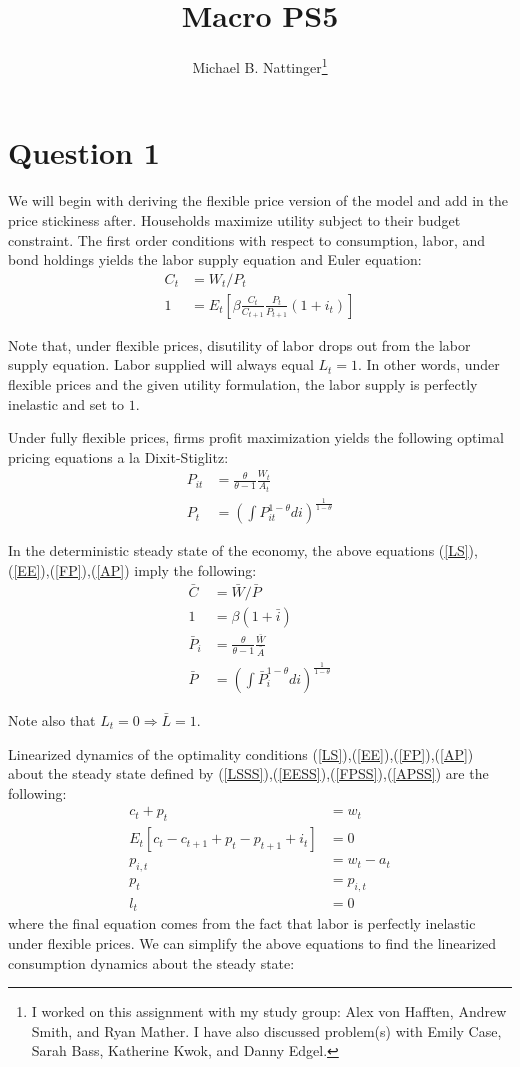 \documentclass[11pt]{article} %
\title{Macro PS5}
\author{Michael B. Nattinger\footnote{I worked on this assignment with my study group: Alex von Hafften, Andrew Smith, and Ryan Mather. I have also discussed problem(s) with Emily Case, Sarah Bass, Katherine Kwok, and Danny Edgel.}}
\begin{document}
\maketitle
\section{Question 1}
We will begin with deriving the flexible price version of the model and add in the price stickiness after. Households maximize utility subject to their budget constraint. The first order conditions with respect to consumption, labor, and bond holdings yields the labor supply equation and Euler equation:
\begin{align}
C_t &= W_t/P_t \label{LS}\\
1 &= E_t\left[ \beta \frac{C_t}{C_{t+1}} \frac{P_t}{P_{t+1}} (1+i_t) \right] \label{EE}
\end{align}

Note that, under flexible prices, disutility of labor drops out from the labor supply equation. Labor supplied will always equal $L_t = 1$. In other words, under flexible prices and the given utility formulation, the labor supply is perfectly inelastic and set to $1$.

Under fully flexible prices, firms profit maximization yields the following optimal pricing equations a la Dixit-Stiglitz:
\begin{align}
P_{it} &= \frac{\theta}{\theta - 1}\frac{W_t}{A_{t}} \label{FP}\\
P_{t} &= \left(\int P_{it}^{1-\theta } di \right)^{\frac{1}{1-\theta}} \label{AP}
\end{align}

In the deterministic steady state of the economy, the above equations (\ref{LS}),(\ref{EE}),(\ref{FP}),(\ref{AP}) imply the following:
\begin{align}
\bar{C} &= \bar{W}/\bar{P} \label{LSSS}\\
1 &= \beta(1+\bar{i}) \label{EESS}\\
\bar{P}_{i} &= \frac{\theta}{\theta - 1}\frac{\bar{W}}{\bar{A}} \label{FPSS}\\
\bar{P} &= \left(\int \bar{P}_{i}^{1-\theta } di \right)^{\frac{1}{1-\theta}} \label{APSS}
\end{align}

Note also that $L_t = 0 \Rightarrow \bar{L} = 1$.

Linearized dynamics of the optimality conditions  (\ref{LS}),(\ref{EE}),(\ref{FP}),(\ref{AP}) about the steady state defined by  (\ref{LSSS}),(\ref{EESS}),(\ref{FPSS}),(\ref{APSS}) are the following:
\begin{align*}
c_t + p_t &= w_t\\
 E_t[c_t - c_{t+1} + p_t - p_{t+1} +i_t] &= 0 \\
p_{i,t} &= w_t - a_t \\
p_t &= p_{i,t} \\
l_t &= 0
\end{align*}
where the final equation comes from the fact that labor is perfectly inelastic under flexible prices. We can simplify the above equations to find the linearized consumption dynamics about the steady state:
\end{document}
